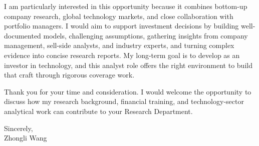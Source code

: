 \documentclass[11pt]{article}
\begin{document}
I am particularly interested in this opportunity because it combines bottom-up company research, global technology markets, and close collaboration with portfolio managers. I would aim to support investment decisions by building well-documented models, challenging assumptions, gathering insights from company management, sell-side analysts, and industry experts, and turning complex evidence into concise research reports. My long-term goal is to develop as an investor in technology, and this analyst role offers the right environment to build that craft through rigorous coverage work.

Thank you for your time and consideration. I would welcome the opportunity to discuss how my research background, financial training, and technology-sector analytical work can contribute to your Research Department.

\vspace{0.15cm}
\noindent Sincerely, \\[0.2cm]
\noindent Zhongli Wang
\end{document}
